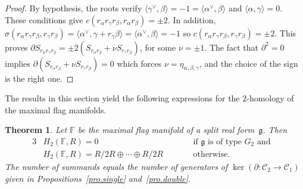 \documentclass[pdftex]{sigma}
\numberwithin{equation}{section}
\newtheorem{Theorem}{Theorem}[section]
\begin{document}
\begin{proof}By hypothesis, the roots verify $\langle \gamma ^{\vee },\beta \rangle =-1= \langle \alpha ^{\vee },\beta \rangle $ and $ \langle \alpha,\gamma \rangle =0$. These conditions give $c( r_{\alpha}r_{\gamma }r_{\beta },r_{\alpha }r_{\beta }) =\pm 2$. In addition, $\sigma (r_{\alpha }r_{\gamma }r_{\beta },r_{\gamma }r_{\beta })=\langle\alpha ^{\vee },\gamma +r_{\gamma }\beta \rangle =\langle \alpha^{\vee },\beta \rangle =-1$ so $c(r_{\alpha }r_{\gamma }r_{\beta},r_{\gamma }r_{\beta })=\pm 2$. This proves $\partial S_{r_{\alpha}r_{\gamma }r_{\beta }}=\pm 2(S_{r_{\alpha }r_{\beta }}+\nu S_{r_{\gamma}r_{\beta }})$, for some $\nu =\pm 1$. The fact that $\partial ^{2}=0$ implies $\partial ( S_{r_{\alpha }r_{\beta }}+\nu S_{r_{\gamma }r_{\beta }}) =0$ which forces $\nu =\eta_{\alpha,\beta,\gamma }$, and the choice of the sign is the right one.
\end{proof}

The results in this section yield the following expressions for the $2$-homology of the maximal flag manifolds.

\begin{Theorem}\label{thm.2homfull}Let $\mathbb{F}$ be the maximal flag manifold of a split real form~$\mathfrak{g}$. Then
\begin{alignat*}{3}
& H_{2} ( \mathbb{F},R ) = 0\qquad && \mbox{if }\mathfrak{g} \mbox{ is of type }G_{2}\mbox{ and} & \\
& H_{2} ( \mathbb{F},R ) = R/2R\oplus \cdots \oplus R/2R \qquad && \mbox{otherwise}.&
\end{alignat*}
The number of summands equals the number of generators of $\ker( \partial\colon \mathcal{C}_{2}\longrightarrow \mathcal{C}_{1})$ given in Propositions~{\rm \ref{pro.single}} and~{\rm \ref{pro.double}}.
\end{Theorem}
\end{document}

